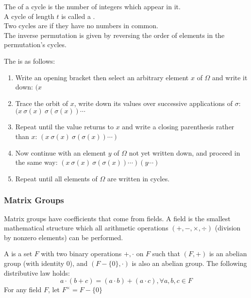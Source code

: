 \begin{definition}
The  of a cycle is the number of integers which appear in it.\\
A cycle of length $t$ is called a .\\
Two cycles are  if they have no numbers in common.\\
The inverse permutation is given by reversing the order of elements in the permutation's cycles.
\end{definition}

\begin{algorithm}
The  is as follows:
\begin{enumerate}[label=\arabic*.]
\setlength{\itemsep}{0pt}
\item Write an opening bracket then select an arbitrary element $x$ of $\Omega$ and write it down: $(x$
\item Trace the orbit of $x$, write down its values over successive applications of $\sigma$: $(x \ \sigma(x) \ \sigma(\sigma(x)) \cdots$
\item Repeat until the value returns to $x$ and write a closing parenthesis rather than $x$: $(x \ \sigma(x) \ \sigma(\sigma(x)) \cdots)$
\item Now continue with an element $y$ of $\Omega$ not yet written down, and proceed in the same way: $(x \ \sigma(x) \ \sigma(\sigma(x)) \cdots)(y \cdots)$
\item Repeat until all elements of $\Omega$ are written in cycles.
\end{enumerate}
\end{algorithm}

\subsubsection{Matrix Groups}

Matrix groups have coefficients that come from fields. A field is the smallest mathematical structure which all arithmetic operations $(+, -, \times, \div)$ (division by nonzero elements) can be performed.

\begin{definition}
A  is a set $F$ with two binary operations $+, \cdot$ on $F$ such that $(F, +)$ is an abelian group (with identity $0$), and $(F-\{0\}, \cdot)$ is also an abelian group. The following distributive law holds:
\begin{equation}
a\cdot (b+c) = (a \cdot b) + (a \cdot c), \forall a,b,c \in F \nonumber
\end{equation}
For any field $F$, let $F^{\times} = F - \{0\}$
\end{definition}

